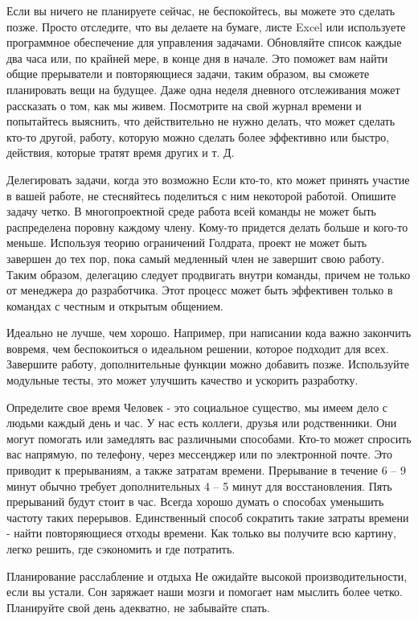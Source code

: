\documentclass{../industrial-development}
\begin{document}
\lecturenotes

Если вы ничего не планируете сейчас, не беспокойтесь, вы можете это сделать позже. Просто отследите, что вы делаете на бумаге, листе Excel или используете программное обеспечение для управления задачами. Обновляйте список каждые два часа или, по крайней мере, в конце дня в начале. Это поможет вам найти общие прерыватели и повторяющиеся задачи, таким образом, вы сможете планировать вещи на будущее. Даже одна неделя дневного отслеживания может рассказать о том, как мы живем.
Посмотрите на свой журнал времени и попытайтесь выяснить, что действительно не нужно делать, что может сделать кто-то другой, работу, которую можно сделать более эффективно или быстро, действия, которые тратят время других и т. Д.

Делегировать задачи, когда это возможно
Если кто-то, кто может принять участие в вашей работе, не стесняйтесь поделиться с ним некоторой работой. Опишите задачу четко.
В многопроектной среде работа всей команды не может быть распределена поровну каждому члену. Кому-то придется делать больше и кого-то меньше. Используя теорию ограничений Голдрата, проект не может быть завершен до тех пор, пока самый медленный член не завершит свою работу. Таким образом, делегацию следует продвигать внутри команды, причем не только от менеджера до разработчика. Этот процесс может быть эффективен только в командах с честным и открытым общением.

Идеально не лучше, чем хорошо.
Например, при написании кода важно закончить вовремя, чем беспокоиться о идеальном решении, которое подходит для всех. Завершите работу, дополнительные функции можно добавить позже.  Используйте модульные тесты, это может улучшить качество и ускорить разработку.

Определите свое время
Человек - это социальное существо, мы имеем дело с людьми каждый день и час. У нас есть коллеги, друзья или родственники. Они могут помогать или замедлять вас различными способами. Кто-то может спросить вас напрямую, по телефону, через мессенджер или по электронной почте. Это приводит к прерываниям, а также затратам времени. Прерывание в течение 6 -- 9 минут обычно требует дополнительных 4 -- 5 минут для восстановления. Пять прерываний будут стоит в час. Всегда хорошо думать о способах уменьшить частоту таких перерывов. Единственный способ сократить такие затраты времени - найти повторяющиеся отходы времени. Как только вы получите всю картину, легко решить, где сэкономить и где потратить.

Планирование расслабление и отдыха
Не ожидайте высокой производительности, если вы устали. Сон заряжает наши мозги и помогает нам мыслить более четко. Планируйте свой день адекватно, не забывайте спать.
\end{document}
